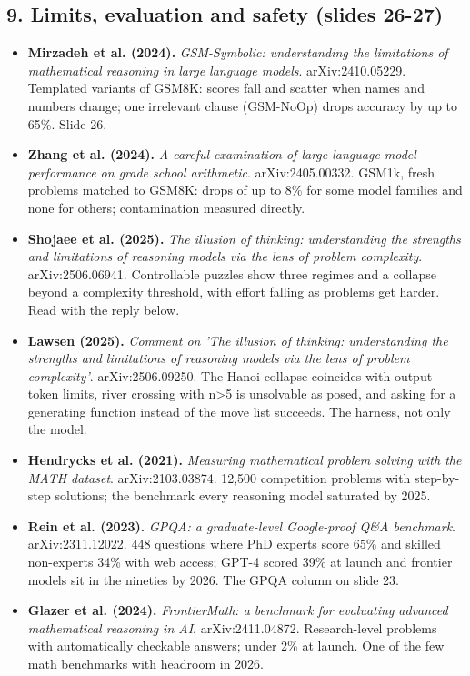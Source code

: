 \documentclass[11pt,letterpaper]{article}
\begin{document}
\subsection*{9. Limits, evaluation and safety (slides 26-27)}
\begin{itemize}[leftmargin=1.2em,itemsep=3pt]\sloppy
\item \textbf{Mirzadeh et al. (2024).} \textit{GSM-Symbolic: understanding the limitations of mathematical reasoning in large language models}. arXiv:2410.05229. Templated variants of GSM8K: scores fall and scatter when names and numbers change; one irrelevant clause (GSM-NoOp) drops accuracy by up to 65\%. Slide 26.
\item \textbf{Zhang et al. (2024).} \textit{A careful examination of large language model performance on grade school arithmetic}. arXiv:2405.00332. GSM1k, fresh problems matched to GSM8K: drops of up to 8\% for some model families and none for others; contamination measured directly.
\item \textbf{Shojaee et al. (2025).} \textit{The illusion of thinking: understanding the strengths and limitations of reasoning models via the lens of problem complexity}. arXiv:2506.06941. Controllable puzzles show three regimes and a collapse beyond a complexity threshold, with effort falling as problems get harder. Read with the reply below.
\item \textbf{Lawsen (2025).} \textit{Comment on 'The illusion of thinking: understanding the strengths and limitations of reasoning models via the lens of problem complexity'}. arXiv:2506.09250. The Hanoi collapse coincides with output-token limits, river crossing with n>5 is unsolvable as posed, and asking for a generating function instead of the move list succeeds. The harness, not only the model.
\item \textbf{Hendrycks et al. (2021).} \textit{Measuring mathematical problem solving with the MATH dataset}. arXiv:2103.03874. 12,500 competition problems with step-by-step solutions; the benchmark every reasoning model saturated by 2025.
\item \textbf{Rein et al. (2023).} \textit{GPQA: a graduate-level Google-proof Q\&A benchmark}. arXiv:2311.12022. 448 questions where PhD experts score 65\% and skilled non-experts 34\% with web access; GPT-4 scored 39\% at launch and frontier models sit in the nineties by 2026. The GPQA column on slide 23.
\item \textbf{Glazer et al. (2024).} \textit{FrontierMath: a benchmark for evaluating advanced mathematical reasoning in AI}. arXiv:2411.04872. Research-level problems with automatically checkable answers; under 2\% at launch. One of the few math benchmarks with headroom in 2026.

\end{itemize}
\end{document}
